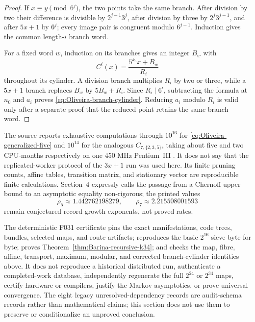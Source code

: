 \begin{proof}
If $x\equiv y\pmod{6^j}$, the two points take the same branch.  After
division by two their difference is divisible by $2^{j-1}3^j$, after
division by three by $2^j3^{j-1}$, and after $5x+1$ by $6^j$; every image
pair is congruent modulo $6^{j-1}$.  Induction gives the common length-$i$
branch word.

For a fixed word $w$, induction on its branches gives an integer $B_w$ with
\[
 C^i(x)=\frac{5^{k_5}x+B_w}{R_i}
\]
throughout its cylinder.  A division branch multiplies $R_i$ by two or
three, while a $5x+1$ branch replaces $B_w$ by $5B_w+R_i$.  Since
$R_i\mid6^i$, subtracting the formula at $n_0$ and $a_i$ proves
\eqref{eq:Oliveira-branch-cylinder}.  Reducing $a_i$ modulo $R_i$ is valid
only after a separate proof that the reduced point retains the same branch
word.
\end{proof}

The source reports exhaustive computations through $10^{16}$ for
\eqref{eq:Oliveira-generalized-five} and $10^{14}$ for the analogous
$C_{7,\{2,3,5\}}$, taking about five and two CPU-months respectively on one
450 MHz Pentium~III \cite[pp.~200--204]{OliveiraSilva2010}.  It does not say
that the replicated-worker protocol of the $3x+1$ run was used here.  Its
finite pruning counts, affine tables, transition matrix, and stationary
vector are reproducible finite calculations.  Section~4 expressly calls the
passage from a Chernoff upper bound to an asymptotic equality non-rigorous;
the printed values
\[
 \rho_5\approx1.442762198279,\qquad
 \rho_7\approx2.215508001593
\]
remain conjectured record-growth exponents, not proved rates.

\begin{nonclaim}
The deterministic F031 certificate pins the exact manifestations, code
trees, bundles, selected maps, and route artifacts; reproduces the basic
$2^{16}$ sieve byte for byte; proves
Theorem~\ref{thm:Barina-recursive-k34}; and checks the map, fibre, affine,
transport, maximum, modular, and corrected branch-cylinder identities above.
It does not reproduce a historical distributed run, authenticate a
completed-work database, independently regenerate the full $2^{24}$ or
$2^{34}$ maps, certify hardware or compilers, justify the Markov asymptotics,
or prove universal convergence. The eight legacy unresolved-dependency records
are audit-schema records rather than mathematical claims; this section does not
use them to preserve or conditionalize an unproved conclusion.
\end{nonclaim}
